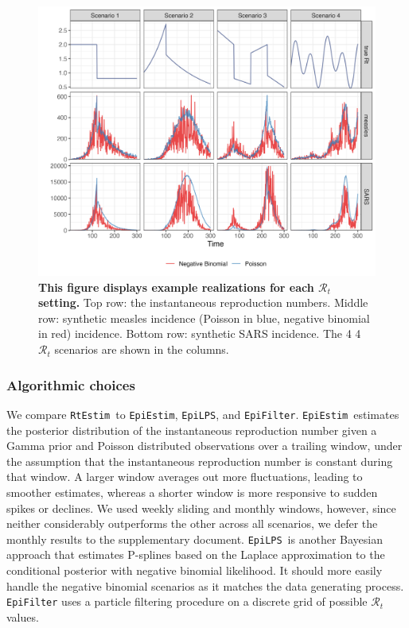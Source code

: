 \documentclass[10pt,letterpaper]{article}
\def\RtEstim{\texttt{RtEstim}}
\def\EpiEstim{\texttt{EpiEstim}}
\def\EpiLPS{\texttt{EpiLPS}}
\def\EpiFilter{\texttt{EpiFilter}}
\def\calR{\mathcal{R}}
\begin{document}
\begin{figure}[!t]
  \centering
  \includegraphics[width=1.0\linewidth]{fig/Fig2.png}
  \caption{{\bf This figure displays example realizations for each $\calR_t$ setting.}
  Top row: the instantaneous reproduction numbers. Middle row: synthetic measles
  incidence (Poisson in blue, negative binomial in red) incidence. Bottom row:
  synthetic SARS incidence. The 4 4 $\calR_t$ scenarios are shown in the
  columns.} 
  \label{fig:samples}
\end{figure}

\subsubsection{Algorithmic choices}

We compare \RtEstim\ to \EpiEstim, \EpiLPS, and \EpiFilter. \EpiEstim\ estimates
the posterior distribution of the instantaneous reproduction number given a
Gamma prior and Poisson distributed observations over a trailing window, under
the assumption that the instantaneous reproduction number is constant during
that window. A larger window averages out more fluctuations, leading to smoother
estimates, whereas a shorter window is more responsive to sudden spikes or
declines. We used weekly sliding and monthly windows, however, since neither
considerably outperforms the other across all scenarios, we defer the monthly
results to the supplementary document. \EpiLPS\ is another Bayesian approach
that estimates P-splines based on the Laplace approximation to the conditional
posterior with negative binomial likelihood. It should more easily handle the
negative binomial scenarios as it matches the data generating process.
\texttt{EpiFilter} uses a particle filtering procedure on a discrete grid of
possible $\calR_t$ values.
\end{document}
